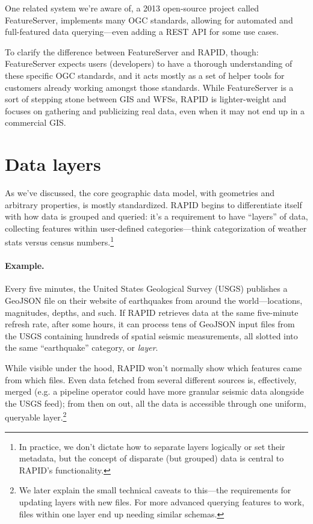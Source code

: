 One related system we're aware of, a 2013 open-source project called FeatureServer, implements many OGC standards, allowing for automated and full-featured data querying---even adding a REST API for some use cases.

To clarify the difference between FeatureServer and RAPID, though: FeatureServer expects users (developers) to have a thorough understanding of these specific OGC standards, and it acts mostly as a set of helper tools for customers already working amongst those standards. While FeatureServer is a sort of stepping stone between GIS and WFSs, RAPID is lighter-weight and focuses on gathering and publicizing real data, even when it may not end up in a commercial GIS.


\section{Data layers}
\label{reqs_layers}
As we've discussed, the core geographic data model, with geometries and arbitrary properties, is mostly standardized. RAPID begins to differentiate itself with how data is grouped and queried: it's a requirement to have ``layers'' of data, collecting features within user-defined categories---think categorization of weather stats versus census numbers.\footnote{In practice, we don't dictate how to separate layers logically or set their metadata, but the concept of disparate (but grouped) data is central to RAPID's functionality.}

\paragraph{Example.}
Every five minutes, the United States Geological Survey (USGS) publishes a GeoJSON file on their website of earthquakes from around the world---locations, magnitudes, depths, and such. If RAPID retrieves data at the same five-minute refresh rate, after some hours, it can process tens of GeoJSON input files from the USGS containing hundreds of spatial seismic measurements, all slotted into the same ``earthquake'' category, or \textit{layer}.

While visible under the hood, RAPID won't normally show which features came from which files. Even data fetched from several different sources is, effectively, merged (e.g. a pipeline operator could have more granular seismic data alongside the USGS feed); from then on out, all the data is accessible through one uniform, queryable layer.\footnote{We later explain the small technical caveats to this---the requirements for updating layers with new files. For more advanced querying features to work, files within one layer end up needing similar schemas.}

